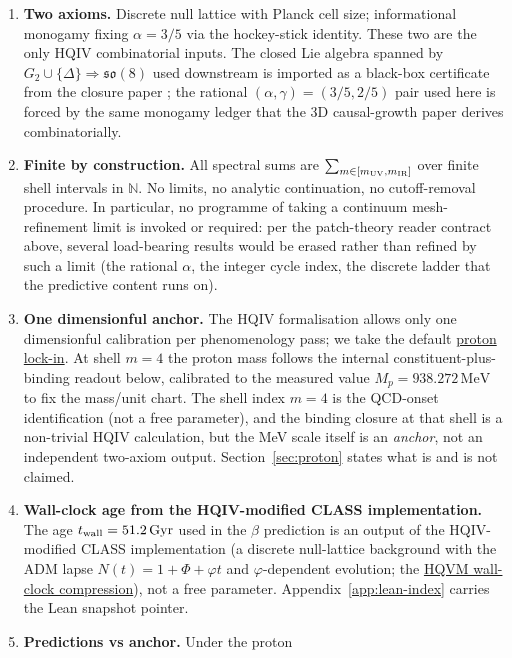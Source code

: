 \documentclass[11pt]{amsart}
\begin{document}
\begin{enumerate}[leftmargin=2em]
\item \textbf{Two axioms.}  Discrete null lattice with Planck cell
  size; informational monogamy fixing $\alpha=3/5$ via the
  hockey-stick identity.  These two are the only HQIV
  combinatorial inputs.  The closed Lie algebra spanned by
  $G_2\cup\{\Delta\}\Rightarrow\mathfrak{so}(8)$ used downstream is
  imported as a black-box certificate from the closure paper
  \cite{hqiv-so8-paper}; the rational $(\alpha,\gamma)=(3/5,2/5)$
  pair used here is forced by the same monogamy ledger that the
  3D causal-growth paper \cite{hqiv-3d-growth-paper} derives
  combinatorially.
\item \textbf{Finite by construction.}  All spectral sums are
  $\sum_{m\in[m_{\rm UV},m_{\rm IR}]}$ over finite shell intervals
  in $\mathbb{N}$.  No limits, no analytic continuation, no
  cutoff-removal procedure.  In particular, no programme of
  taking a continuum mesh-refinement limit is invoked or
  required: per the patch-theory reader contract above, several
  load-bearing results would be erased rather than refined by
  such a limit (the rational $\alpha$, the integer cycle index,
  the discrete ladder that the predictive content runs on).
\item \textbf{One dimensionful anchor.}  The HQIV formalisation
  \cite{hqiv-lean} allows only one dimensionful calibration per
  phenomenology pass; we take the default
  \hyperref[lean:proton-lockin]{proton lock-in}.  At shell
  $m=4$ the proton mass follows the internal
  constituent-plus-binding readout below, calibrated to the
  measured value $M_p=938.272\,\mathrm{MeV}$ to fix the mass/unit
  chart.  The shell index $m=4$ is the QCD-onset identification
  (not a free parameter), and the binding closure at that shell is
  a non-trivial HQIV calculation, but the MeV scale itself is an
  \emph{anchor}, not an independent two-axiom output.
  Section~\ref{sec:proton} states what is and is not claimed.
\item \textbf{Wall-clock age from the HQIV-modified CLASS
  implementation.}  The age $t_{\rm wall}=51.2\,\mathrm{Gyr}$
  used in the $\beta$ prediction is an output of the
  HQIV-modified CLASS implementation (a discrete null-lattice
  background with the ADM lapse $N(t)=1+\Phi+\varphi t$ and
  $\varphi$-dependent evolution; the
  \hyperref[lean:wall-clock]{HQVM wall-clock compression}), not
  a free parameter.  Appendix~\ref{app:lean-index} carries the
  Lean snapshot pointer.
\item \textbf{Predictions vs anchor.}  Under the proton

\end{enumerate}
\end{document}
